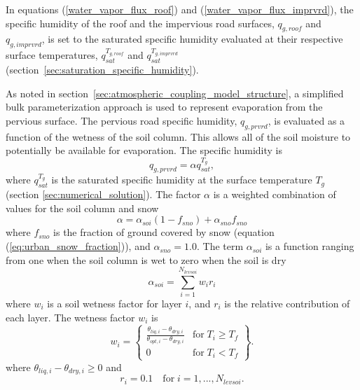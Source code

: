 \documentclass[12pt,authoryear]{elsarticle}
\numberwithin{equation}{section} %
\begin{document}
In equations (\ref{water_vapor_flux_roof}) and (\ref{water_vapor_flux_imprvrd}), the specific humidity of the roof and the impervious road surfaces, $q_{g,roof}$ and $q_{g,imprvrd}$, is set to the saturated specific humidity evaluated at their respective surface temperatures, $q_{sat}^{T_{g,roof}}$ and $q_{sat}^{T_{g,imprvrd}}$ (section~\ref{sec:saturation_specific_humidity}).

As noted in section~\ref{sec:atmospheric_coupling_model_structure}, a simplified bulk parameterization approach is used to represent evaporation from the pervious surface. The pervious road specific humidity, $q_{g,prvrd}$, is evaluated as a function of the wetness of the soil column. This allows all of the soil moisture to potentially be available for evaporation. The specific humidity is
\begin{equation}
q_{g,prvrd}=\alpha q_{sat}^{T_{g}},
\end{equation}
where $q_{sat}^{T_{g}}$ is the saturated specific humidity at the surface temperature $T_{g}$ (section \ref{sec:numerical_solution}). The factor $\alpha$ is a weighted combination of values for the soil column and snow
\begin{equation}
\alpha=\alpha_{soi}(1-f_{sno})+\alpha_{sno}f_{sno}
\end{equation}
where $f_{sno}$ is the fraction of ground covered by snow (equation (\ref{eq:urban_snow_fraction})), and $\alpha_{sno}=1.0$. The term $\alpha_{soi}$ is a function ranging from one when the soil column is wet to zero when the soil is dry
\begin{equation}
\label{eq:soil_wetness_range}
\alpha_{soi}=\sum_{i=1}^{N_{levsoi}}w_{i}r_{i}
\end{equation}
where $w_{i}$ is a soil wetness factor for layer $i$, and $r_{i}$ is the relative contribution of each layer. The wetness factor $w_{i}$ is
\begin{equation}
\label{eq:wetness_factor}
w_{i}=\left \{
\begin{array}{ll}
\frac{\theta_{liq,i}-\theta_{dry,i}}{\theta_{opt,i}-\theta_{dry,i}} & \textrm{for} \; T_{i} \geq T_{f}\\
0 & \textrm{for} \; T_{i} < T_{f}
\end{array}
\right \}.
\end{equation}
where $\theta_{liq,i}-\theta_{dry,i}\geq0$ and 
\begin{equation}
\label{eq:relative_contribution_each_layer}
r_{i}=0.1 \quad \textrm{for}\; i=1,...,N_{levsoi}.  
\end{equation}
\end{document}
